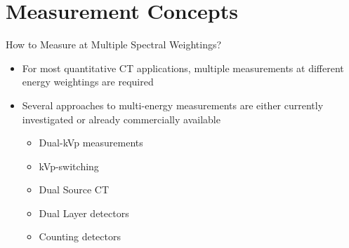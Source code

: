 \section{Measurement Concepts}

\begin{frame}[c]{How to Measure at Multiple Spectral Weightings?}
    \begin{itemize}
        \setlength\itemsep{0.4cm}
        \item For most quantitative CT applications, multiple measurements at different energy weightings are required
        \item Several approaches to multi-energy measurements are either currently investigated or already commercially available
              \begin{itemize}
                  \item Dual-kVp measurements
                  \item kVp-switching
                  \item Dual Source CT
                  \item Dual Layer detectors
                  \item Counting detectors
              \end{itemize}
    \end{itemize}
\end{frame}

